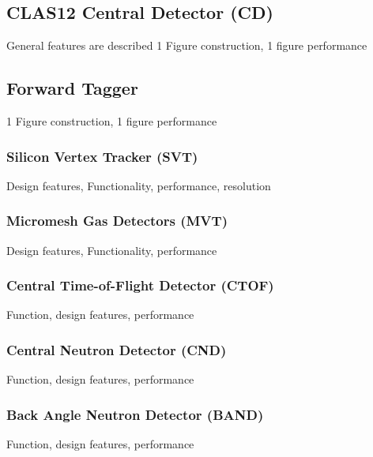 \subsection{CLAS12 Central Detector (CD)}
General features are described
1 Figure construction, 1 figure performance
\vspace{0.3cm}\noindent
\subsection{Forward Tagger}
\label{ft}
1 Figure construction, 1 figure performance
\vspace{0.3cm}\noindent
\subsubsection{Silicon Vertex Tracker (SVT)}
Design features, Functionality, performance, resolution
\vspace{0.3cm}\noindent
\subsubsection{Micromesh Gas Detectors (MVT)}
Design features, Functionality, performance
\vspace{0.3cm}\noindent
\subsubsection{Central Time-of-Flight Detector (CTOF)}
Function, design features, performance

\vspace{0.3cm}\noindent
\subsubsection{Central Neutron Detector (CND)}
Function, design features, performance
\vspace{0.3cm}\noindent
\subsubsection{Back Angle Neutron Detector (BAND)}
Function, design features, performance
\vspace{0.3cm}\noindent
